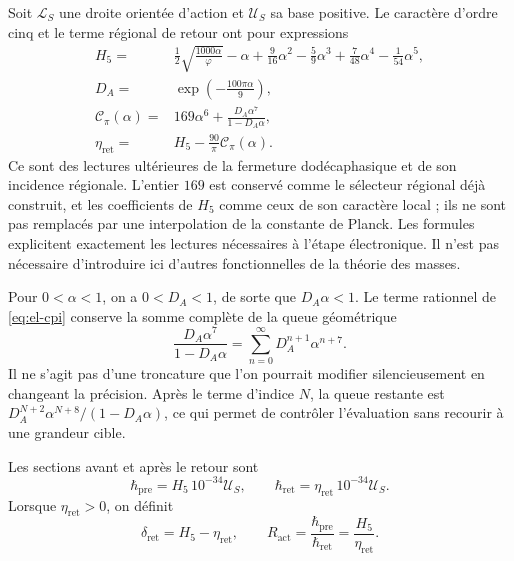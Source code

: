 Soit \(\mathcal L_S\) une droite orientée d'action et \(\mathcal U_S\)
sa base positive. Le caractère d'ordre cinq et le terme régional de
retour ont pour expressions
\begin{align}
 H_5={}&\frac12\sqrt{\frac{1000\alpha}{\varphi}}-\alpha
   +\frac9{16}\alpha^2-\frac59\alpha^3
   +\frac7{48}\alpha^4-\frac1{54}\alpha^5,
   \label{eq:el-h5}\\
 D_A={}&\exp\!\left(-\frac{100\pi\alpha}{9}\right),
   \label{eq:el-da}\\
 \mathcal C_\pi(\alpha)={}&169\alpha^6+
       \frac{D_A\alpha^7}{1-D_A\alpha},
   \label{eq:el-cpi}\\
 \eta_{\mathrm{ret}}={}&H_5-\frac{90}{\pi}\mathcal C_\pi(\alpha).
   \label{eq:el-eta}
\end{align}
Ce sont des lectures ultérieures de la fermeture dodécaphasique et de son
incidence régionale. L'entier \(169\) est conservé comme le sélecteur
régional déjà construit, et les coefficients de \(H_5\) comme ceux de son
caractère local ; ils ne sont pas remplacés par une interpolation de la constante de
Planck. Les formules explicitent exactement les lectures nécessaires
à l'étape électronique. Il n'est pas nécessaire d'introduire ici d'autres
fonctionnelles de la théorie des masses.

Pour \(0<\alpha<1\), on a \(0<D_A<1\), de sorte que
\(D_A\alpha<1\). Le terme rationnel de \eqref{eq:el-cpi} conserve la
somme complète de la queue géométrique
\begin{equation}
 \frac{D_A\alpha^7}{1-D_A\alpha}
 =\sum_{n=0}^{\infty}D_A^{n+1}\alpha^{n+7}.
 \label{eq:el-cola-regional}
\end{equation}
Il ne s'agit pas d'une troncature que l'on pourrait modifier silencieusement en changeant la
précision. Après le terme d'indice \(N\), la queue restante est
\(D_A^{N+2}\alpha^{N+8}/(1-D_A\alpha)\), ce qui permet de contrôler
l'évaluation sans recourir à une grandeur cible.

\begin{definition}
Les sections avant et après le retour sont
\begin{equation}
 \hbar_{\mathrm{pre}}=H_5\,10^{-34}\mathcal U_S,
 \qquad
 \hbar_{\mathrm{ret}}=\eta_{\mathrm{ret}}\,10^{-34}\mathcal U_S.
 \label{eq:el-secciones-accion}
\end{equation}
Lorsque \(\eta_{\mathrm{ret}}>0\), on définit
\begin{equation}
 \delta_{\mathrm{ret}}=H_5-\eta_{\mathrm{ret}},\qquad
 R_{\mathrm{act}}=\frac{\hbar_{\mathrm{pre}}}{\hbar_{\mathrm{ret}}}
 =\frac{H_5}{\eta_{\mathrm{ret}}}.
 \label{eq:el-ratio}
\end{equation}
\end{definition}

